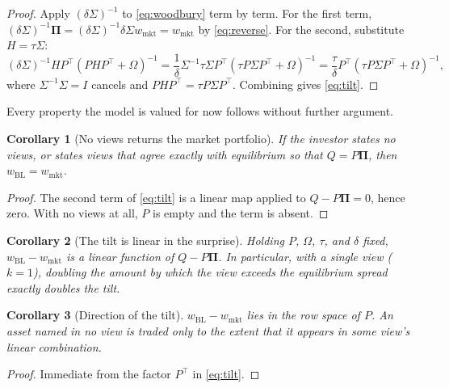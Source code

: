 \documentclass[11pt]{article}
\newtheorem{corollary}{Corollary}
\theoremstyle{remark}
\theoremstyle{definition}
\begin{document}
\begin{proof}
Apply $(\delta\Sigma)^{-1}$ to \eqref{eq:woodbury} term by term. For the first term, $(\delta\Sigma)^{-1}\boldsymbol\Pi = (\delta\Sigma)^{-1}\delta\Sigma w_{\mathrm{mkt}} = w_{\mathrm{mkt}}$ by \eqref{eq:reverse}. For the second, substitute $H = \tau\Sigma$:
\begin{equation*}
(\delta\Sigma)^{-1}HP^\top\left(PHP^\top+\Omega\right)^{-1} = \frac{1}{\delta}\Sigma^{-1}\tau\Sigma P^\top\left(\tau P\Sigma P^\top+\Omega\right)^{-1} = \frac{\tau}{\delta}P^\top\left(\tau P\Sigma P^\top+\Omega\right)^{-1},
\end{equation*}
where $\Sigma^{-1}\Sigma = I$ cancels and $PHP^\top = \tau P\Sigma P^\top$. Combining gives \eqref{eq:tilt}.
\end{proof}

Every property the model is valued for now follows without further argument.

\begin{corollary}[No views returns the market portfolio]
\label{cor:noviews}
If the investor states no views, or states views that agree exactly with equilibrium so that $Q = P\boldsymbol\Pi$, then $w_{\mathrm{BL}} = w_{\mathrm{mkt}}$.
\end{corollary}

\begin{proof}
The second term of \eqref{eq:tilt} is a linear map applied to $Q - P\boldsymbol\Pi = 0$, hence zero. With no views at all, $P$ is empty and the term is absent.
\end{proof}

\begin{corollary}[The tilt is linear in the surprise]
\label{cor:linear}
Holding $P$, $\Omega$, $\tau$, and $\delta$ fixed, $w_{\mathrm{BL}} - w_{\mathrm{mkt}}$ is a linear function of $Q - P\boldsymbol\Pi$. In particular, with a single view ($k=1$), doubling the amount by which the view exceeds the equilibrium spread exactly doubles the tilt.
\end{corollary}

\begin{corollary}[Direction of the tilt]
\label{cor:direction}
$w_{\mathrm{BL}} - w_{\mathrm{mkt}}$ lies in the row space of $P$. An asset named in no view is traded only to the extent that it appears in some view's linear combination.
\end{corollary}

\begin{proof}
Immediate from the factor $P^\top$ in \eqref{eq:tilt}.
\end{proof}
\end{document}
